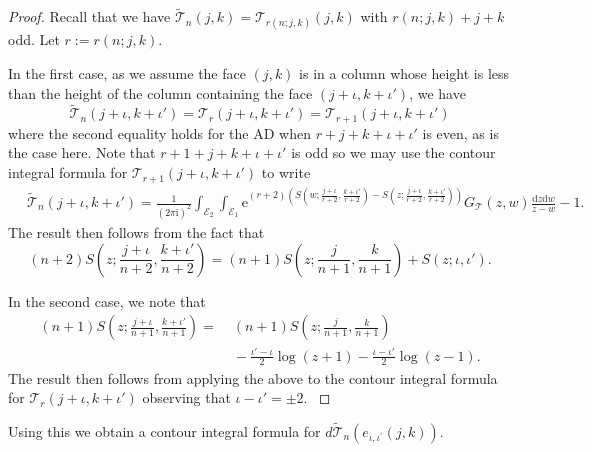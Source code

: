 \documentclass[12pt]{amsart}
\newcommand{\cT}{\mathcal T}
\newcommand{\io}{{\iota}}
\numberwithin{equation}{section}
\theoremstyle{definition}
\begin{document}
\begin{proof}
Recall that we have $\widetilde{\cT}_{n}(j,k) = \cT_{r(n;j,k)}(j,k)$ with $r(n;j,k)+j+k$ odd. Let $r:=r(n;j,k)$. 

{In the first case,} as we assume the face $(j,k)$ is in a column whose height is less than the height of the column containing the face $(j+\io,k+\io')$, we have
\[
\widetilde{\cT}_{n}(j+\io,k+\io') = \cT_{r}(j+\io,k+\io') = \cT_{r+1}(j+\io,k+\io') 
\]
where the second equality holds for the AD when $r+j+k+\io+\io'$ is even, as is the case here. Note that $r+1+j+k+\io+\io'$ is odd so we may use the contour integral formula for $\cT_{r+1}(j+\io,k+\io')$ to write
\[
\begin{aligned}
      &\, \widetilde{\cT}_{n}(j+\io,k+\io')=
       \frac{1}{(2 \pi \mathrm{i})^2} \int_{\mathcal{E}_2} \int_{\mathcal{E}_1} \mathrm e^{\left(r+2\right)\left(S(w;\frac{j+\io}{r+2},\frac{k+\io'}{r+2})-S(z;\frac{j+\io}{r+2},\frac{k+\io'}{r+2})\right)} G_{\mathcal{T}}(z, w) \frac{\mathrm d z\mathrm d w}{z-w}-1.
\end{aligned}
\]
The result then follows from the fact that
\begin{equation*}
    \label{eq:action recursion}
    (n+2)S(z; \frac{j+\io}{n+2},\frac{k+\io'}{n+2})=(n+1)S(z;\frac{j}{n+1},\frac{k}{n+1})+ S(z;\io,\io').
\end{equation*}

{
In the second case, we note that
\begin{equation*}
\begin{aligned}
(n+1)S(z; \frac{j+\io}{n+1},\frac{k+\io'}{n+1}) =&\; (n+1)S(z; \frac{j}{n+1},\frac{k}{n+1})\\
&\; -\frac{\io'-\io}{2} \log(z+1) - \frac{\io-\io'}{2} \log(z-1).
\end{aligned}
\end{equation*}
The result then follows from applying the above to the contour integral formula for $\cT_r(j+\io,k+\io')$ observing that $\io-\io'=\pm2$.
}
\end{proof}

Using this we obtain a contour integral formula for $d \widetilde{\mathcal{T}}_n\left(e_{\iota, \iota^{\prime}}(j, k)\right)$.
\end{document}
